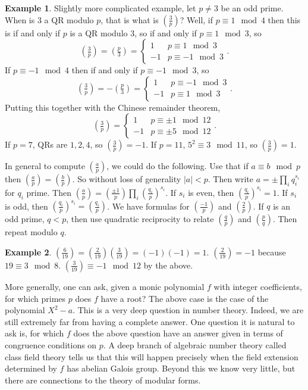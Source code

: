 \documentclass{article}
\newcommand{\rb}[1]{\left( #1 \right)}
\newcommand{\abs}[1]{\left\lvert #1 \right\rvert}
\newcommand{\legendre}[2]{\rb{\tfrac{#1}{#2}}}
\theoremstyle{definition}\newtheorem{definition}{Definition}
\theoremstyle{definition}\newtheorem{remark}[definition]{Remark}
\theoremstyle{definition}\newtheorem*{example}{Example}
\theoremstyle{definition}\newtheorem*{note}{Note}
\begin{document}
\begin{example}
Slightly more complicated example, let $ p \ne 3 $ be an odd prime. When is $ 3 $ a QR modulo $ p $, that is what is $ \legendre{3}{p} $? Well, if $ p \equiv 1 \mod 4 $ then this is if and only if $ p $ is a QR modulo $ 3 $, so if and only if $ p \equiv 1 \mod 3 $, so
$$ \legendre{3}{p} = \legendre{p}{3} = \begin{cases} 1 & p \equiv 1 \mod 3 \\ -1 & p \equiv -1 \mod 3 \end{cases}. $$
If $ p \equiv -1 \mod 4 $ then if and only if $ p \equiv -1 \mod 3 $, so
$$ \legendre{3}{p} = -\legendre{p}{3} = \begin{cases} 1 & p \equiv -1 \mod 3 \\ -1 & p \equiv 1 \mod 3 \end{cases}. $$
Putting this together with the Chinese remainder theorem,
$$ \legendre{3}{p} = \begin{cases} 1 & p \equiv \pm 1 \mod 12 \\ -1 & p \equiv \pm 5 \mod 12 \end{cases}. $$
If $ p = 7 $, QRs are $ 1, 2, 4 $, so $ \legendre{3}{p} = -1 $. If $ p = 11 $, $ 5^2 \equiv 3 \mod 11 $, so $ \legendre{3}{p} = 1 $.
\end{example}

In general to compute $ \legendre{a}{p} $, we could do the following. Use that if $ a \equiv b \mod p $ then $ \legendre{a}{p} = \legendre{b}{p} $. So without loss of generality $ \abs{a} < p $. Then write $ a = \pm \prod_i q_i^{s_i} $ for $ q_i $ prime. Then $ \legendre{a}{p} = \legendre{\pm 1}{p} \prod_i \legendre{q_i}{p}^{s_i} $. If $ s_i $ is even, then $ \legendre{q_i}{p}^{s_i} = 1 $. If $ s_i $ is odd, then $ \legendre{q_i}{p}^{s_i} = \legendre{q_i}{p} $. We have formulas for $ \legendre{-1}{p} $ and $ \legendre{2}{p} $. If $ q $ is an odd prime, $ q < p $, then use quadratic reciprocity to relate $ \legendre{q}{p} $ and $ \legendre{p}{q} $. Then repeat modulo $ q $.

\begin{example}
$ \legendre{6}{19} = \legendre{2}{19}\legendre{3}{19} = \rb{-1}\rb{-1} = 1 $. $ \legendre{2}{19} = -1 $ because $ 19 \equiv 3 \mod 8 $. $ \legendre{3}{19} \equiv -1 \mod 12 $ by the above.
\end{example}

More generally, one can ask, given a monic polynomial $ f $ with integer coefficients, for which primes $ p $ does $ f $ have a root? The above case is the case of the polynomial $ X^2 - a $. This is a very deep question in number theory. Indeed, we are still extremely far from having a complete answer. One question it is natural to ask is, for which $ f $ does the above question have an answer given in terms of congruence conditions on $ p $. A deep branch of algebraic number theory called class field theory tells us that this will happen precisely when the field extension determined by $ f $ has abelian Galois group. Beyond this we know very little, but there are connections to the theory of modular forms.
\end{document}
